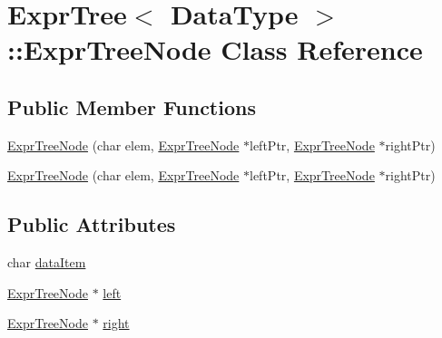 \hypertarget{class_expr_tree_1_1_expr_tree_node}{\section{Expr\+Tree$<$ Data\+Type $>$\+:\+:Expr\+Tree\+Node Class Reference}
\label{class_expr_tree_1_1_expr_tree_node}
}
\subsection*{Public Member Functions}
\begin{DoxyCompactItemize}
\item 
\hyperlink{class_expr_tree_1_1_expr_tree_node_a377132931c65d935746d2fa5d223eee7}{Expr\+Tree\+Node} (char elem, \hyperlink{class_expr_tree_1_1_expr_tree_node}{Expr\+Tree\+Node} $\ast$left\+Ptr, \hyperlink{class_expr_tree_1_1_expr_tree_node}{Expr\+Tree\+Node} $\ast$right\+Ptr)
\item 
\hyperlink{class_expr_tree_1_1_expr_tree_node_a377132931c65d935746d2fa5d223eee7}{Expr\+Tree\+Node} (char elem, \hyperlink{class_expr_tree_1_1_expr_tree_node}{Expr\+Tree\+Node} $\ast$left\+Ptr, \hyperlink{class_expr_tree_1_1_expr_tree_node}{Expr\+Tree\+Node} $\ast$right\+Ptr)
\end{DoxyCompactItemize}
\subsection*{Public Attributes}
\begin{DoxyCompactItemize}
\item 
char \hyperlink{class_expr_tree_1_1_expr_tree_node_a8985f5eb0eb91c438c186a1d55116783}{data\+Item}
\item 
\hyperlink{class_expr_tree_1_1_expr_tree_node}{Expr\+Tree\+Node} $\ast$ \hyperlink{class_expr_tree_1_1_expr_tree_node_ad51eb6b222e7589c48c47344ca564e04}{left}
\item 
\hyperlink{class_expr_tree_1_1_expr_tree_node}{Expr\+Tree\+Node} $\ast$ \hyperlink{class_expr_tree_1_1_expr_tree_node_a7af02913a798115ad57793c470262c04}{right}
\end{DoxyCompactItemize}


